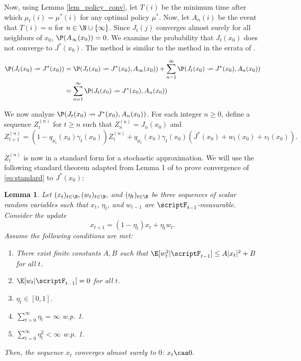 \documentclass[12pt]{article}
\newtheorem{lemma}{Lemma}
\begin{document}
Now, using Lemma \ref{lem_policy_conv}, let $T(i)$ be the minimum time after which $\mu_t(i) = \mu^*(i)$ for any optimal policy $\mu^*$. Now, let $A_n(i)$ be the event that $T(i) = n$ for $n \in \N \cup \{\infty\}$. Since $J_t(j)$ converges almost surely for all neighbors of $x_0$, $\P(A_\infty(x_0)) = 0$. We examine the probability that $J_t(x_0)$ does not converge to $J^*(x_0)$. The method is similar to the method in the errata of \cite{tsitsiklis2002convergence}.

\begin{align*}
    \P(J_t(x_0) \nrightarrow J^*(x_0)) &= \P(J_t(x_0) \nrightarrow J^*(x_0), A_\infty(x_0)) + \sum_{n=1}^\infty \P(J_t(x_0) \nrightarrow J^*(x_0) , A_n(x_0))\\
    &= \sum_{n=1}^\infty \P(J_t(x_0) \nrightarrow J^*(x_0) , A_n(x_0))
\end{align*}

We now analyze $\P(J_t(x_0) \nrightarrow J^*(x_0), A_n(x_0))$. For each integer $n \geq 0$, define a sequence $Z_t^{(n)}$ for $t \geq n$ such that $Z_n^{(n)} = J_n(x_0)$ and
\begin{equation}
    Z_{t+1}^{(n)} = (1-q_{\mu_t}(x_0)\gamma_t(x_0))Z_t^{(n)} + q_{\mu_t}(x_0)\gamma_t(x_0)(J^*(x_0) +  w_t(x_0) + v_t(x_0)). \label{eq:standard}
\end{equation}

$Z_t^{(n)}$ is now in a standard form for a stochastic approximation. We will use the following standard theorem adapted from Lemma 1 of \cite{singh2000convergence}  to prove convergence of \eqref{eq:standard} to $J^*(x_0)$:

\begin{lemma}\label{lem_stochastic_approx}
	Let $(x_t)_{t \in \N}, (w_t)_{t \in \N}, $ and $(\eta_t)_{t \in \N}$ be three sequences of scalar random variables such that $x_t$, $\eta_t$, and $w_{t-1}$ are $\scriptF_{t-1}$-measurable. Consider the update
	\begin{equation*}
		x_{t+1} = (1 - \eta_t)x_t + \eta_t w_t.
	\end{equation*}
	Assume the following conditions are met:
	\begin{enumerate}
		\item There exist finite constants $A, B$ such that $\E[w_t^2 | \scriptF_{t-1}] \leq A|x_t|^2 + B$ for all $t$.
		\item $\E[w_t | \scriptF_{t-1}] = 0$ for all $t$.
		\item $\eta_t \in [0, 1]$.
		\item $\sum_{t=0}^\infty \eta_t = \infty$ w.p. 1.
		\item $\sum_{t=0}^\infty \eta_t^2 < \infty$  w.p. 1.
	\end{enumerate}

Then, the sequence $x_t$ converges almost surely to $0$: $x_t \cas 0.$
\end{lemma}
\end{document}
